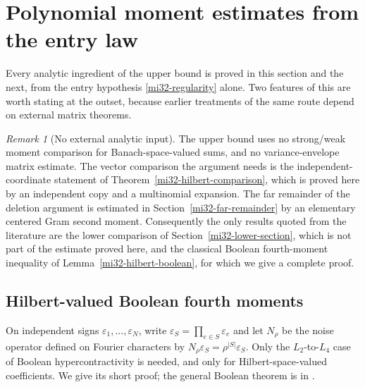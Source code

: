 \documentclass[11pt]{article}
\theoremstyle{definition}
\theoremstyle{remark}
\newtheorem{remark}[theorem]{Remark}
\begin{document}
\section{Polynomial moment estimates from the entry law}
\label{mi32-polynomial-section}

Every analytic ingredient of the upper bound is proved in this section
and the next, from the entry hypothesis \eqref{mi32-regularity} alone.
Two features of this are worth stating at the outset, because earlier
treatments of the same route depend on external matrix theorems.

\begin{remark}[No external analytic input]
\label{mi32-no-external-inputs}
The upper bound uses no strong/weak moment comparison for
Banach-space-valued sums, and no variance-envelope matrix estimate. The
vector comparison the argument needs is the
independent-coordinate statement of
Theorem~\ref{mi32-hilbert-comparison}, which is proved here by an
independent copy and a multinomial expansion. The far remainder of the
deletion argument is estimated in
Section~\ref{mi32-far-remainder} by an elementary centered Gram second
moment. Consequently the only results quoted from the literature are the
lower comparison of Section~\ref{mi32-lower-section}, which is not part
of the estimate proved here, and the classical Boolean fourth-moment
inequality of Lemma~\ref{mi32-hilbert-boolean}, for which we give a
complete proof.
\end{remark}

\subsection{Hilbert-valued Boolean fourth moments}

On independent signs $\varepsilon_1,\ldots,\varepsilon_N$, write
$\varepsilon_S=\prod_{e\in S}\varepsilon_e$ and let $N_\rho$ be the
noise operator defined on Fourier characters by
$N_\rho\varepsilon_S=\rho^{|S|}\varepsilon_S$. Only the
$L_2$-to-$L_4$ case of Boolean hypercontractivity is needed, and only
for Hilbert-space-valued coefficients. We give its short proof; the
general Boolean theorem is in \cite[Ch.~9--10]{ODonnellBoolean}.
\end{document}
